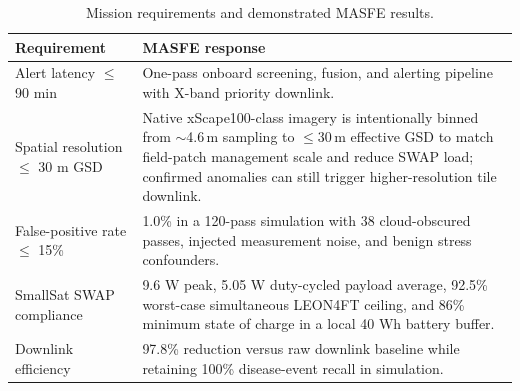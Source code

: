 \begin{table}[H]
\centering
\caption{Mission requirements and demonstrated MASFE results.}
\label{tab:req-results}
\begin{tabularx}{\linewidth}{p{3.2cm}X}
\toprule
\textbf{Requirement} & \textbf{MASFE response} \\
\midrule
Alert latency $\leq$ 90 min & One-pass onboard screening, fusion, and alerting pipeline with X-band priority downlink. \\
Spatial resolution $\leq$ 30 m GSD & Native xScape100-class imagery is intentionally binned from $\sim$4.6\,m sampling to $\leq$30\,m effective GSD to match field-patch management scale and reduce SWAP load; confirmed anomalies can still trigger higher-resolution tile downlink. \\
False-positive rate $\leq$ 15\% & 1.0\% in a 120-pass simulation with 38 cloud-obscured passes, injected measurement noise, and benign stress confounders. \\
SmallSat SWAP compliance & 9.6 W peak, 5.05 W duty-cycled payload average, 92.5\% worst-case simultaneous LEON4FT ceiling, and 86\% minimum state of charge in a local 40 Wh battery buffer. \\
Downlink efficiency & 97.8\% reduction versus raw downlink baseline while retaining 100\% disease-event recall in simulation. \\
\bottomrule
\end{tabularx}
\end{table}

